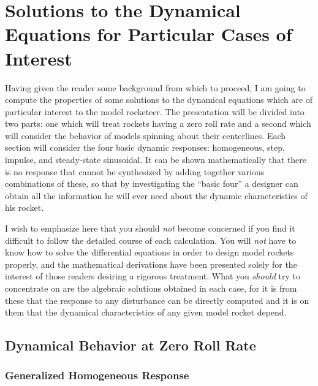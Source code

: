 \section{Solutions to the Dynamical Equations for Particular Cases of Interest}\label{ch2:sec:3}

Having given the reader some background from which to proceed, I am going to
compute the properties of some solutions to the dynamical equations which are
of particular interest to the model rocketeer. The presentation will be divided
into two parts: one which will treat rockets having a zero roll rate and a
second which will consider the behavior of models spinning about their
centerlines. Each section will consider the four basic dynamic responses:
homogeneous, step, impulse, and steady-state sinusoidal. It can be shown
mathematically that there is no response that cannot be synthesized by adding
together various combinations of these, so that by investigating the ``basic
four'' a designer can obtain all the information he will ever need about the
dynamic characteristics of his rocket.

I wish to emphasize here that you should \emph{not} become concerned if you
find it difficult to follow the detailed course of each calculation. You will
\emph{not} have to know how to solve the differential equations in order to
design model rockets properly, and the mathematical derivations have been
presented solely for the interest of those readers desiring a rigorous
treatment. What you \emph{should} try to concentrate on are the algebraic
solutions obtained in each case, for it is from these that the response to any
disturbance can be directly computed and it is on them that the dynamical
characteristics of any given model rocket depend.

\subsection{Dynamical Behavior at Zero Roll Rate}\label{ch2:sec:3.1}

\subsubsection{Generalized Homogeneous Response}\label{ch2:sec:3.1.1}

